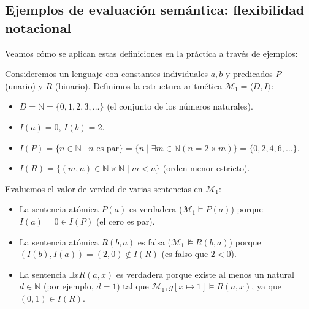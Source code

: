 \subsection{Ejemplos de evaluación semántica: flexibilidad notacional}

Veamos cómo se aplican estas definiciones en la práctica a través de ejemplos:

\begin{ejemplo}
Consideremos un lenguaje con constantes individuales $a, b$ y predicados $P$ (unario) y $R$ (binario). Definimos la estructura aritmética $\mathcal{M}_1 = \langle D, I \rangle$:
\begin{itemize}
    \item $D = \mathbb{N} = \{0, 1, 2, 3, \dots\}$ (el conjunto de los números naturales).
    \item $I(a) = 0$, \quad $I(b) = 2$.
    \item $I(P) = \{n \in \mathbb{N} \mid n \text{ es par}\} = \{n  \mid \exists m\in \mathbb{N} (n = 2\times m)\} = \{0, 2, 4, 6, \dots\}$.
    \item $I(R) = \{(m, n) \in \mathbb{N} \times \mathbb{N} \mid m < n\}$ (orden menor estricto).
\end{itemize}
Evaluemos el valor de verdad de varias sentencias en $\mathcal{M}_1$:
\begin{itemize}
    \item La sentencia atómica $P(a)$ es verdadera ($\mathcal{M}_1 \models P(a)$) porque $I(a) = 0 \in I(P)$ (el cero es par).
    \item La sentencia atómica $R(b, a)$ es falsa ($\mathcal{M}_1 \not\models R(b, a)$) porque $(I(b), I(a)) = (2, 0) \notin I(R)$ (es falso que $2 < 0$).
    \item La sentencia $\exists x R(a, x)$ es verdadera porque existe al menos un natural $d \in \mathbb{N}$ (por ejemplo, $d = 1$) tal que $\mathcal{M}_1, g[x \mapsto 1] \models R(a, x)$, ya que $(0, 1) \in I(R)$.
\end{itemize}
\end{ejemplo}

